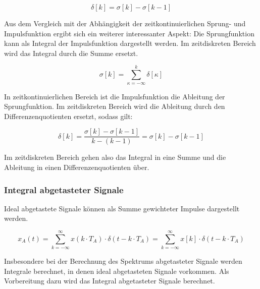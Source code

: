 \begin{equation}\label{eq:threetwentyfour}
\delta \left[k\right]=\sigma \left[k\right]-\sigma \left[k-1\right]
\end{equation}

\noindent Aus dem Vergleich mit der Abh\"{a}ngigkeit der zeitkontinuierlichen Sprung- und Impulsfunktion ergibt sich ein weiterer interessanter Aspekt: Die Sprungfunktion kann als Integral der Impulsfunktion dargestellt werden. Im zeitdiskreten Bereich wird das Integral durch die Summe ersetzt.

\begin{equation}\label{eq:threetwentyfive}
\sigma \left[k\right]=\sum _{\kappa =-\infty }^{k}\delta \left[\kappa \right]
\end{equation}

\noindent In zeitkontinuierlichen Bereich ist die Impulsfunktion die Ableitung der Sprungfunktion. Im zeitdiskreten Bereich wird die Ableitung durch den Differenzenquotienten ersetzt, sodass gilt:

\begin{equation}\label{eq:threetwentysix}
\delta \left[k\right]=\frac{\sigma \left[k\right]-\sigma \left[k-1\right]}{k-(k-1)} =\sigma \left[k\right]-\sigma \left[k-1\right]
\end{equation}

\noindent Im zeitdiskreten Bereich gehen also das Integral in eine Summe und die Ableitung in einen Differenzenquotienten \"{u}ber.

\clearpage

\subsubsection{Integral abgetasteter Signale}

\noindent Ideal abgetastete Signale können als Summe gewichteter Impulse dargestellt werden. 

\begin{equation}\label{eq:threetwentyseven}
x_{A} \left(t\right)=\sum _{k=-\infty }^{\infty }x\left(k\cdot T_{A} \right)\cdot \delta \left(t-k\cdot T_{A} \right) =\sum _{k=-\infty }^{\infty }x\left[k\right]\cdot \delta \left(t-k\cdot T_{A} \right) 
\end{equation}

\noindent Insbesondere bei der Berechnung des Spektrums abgetasteter Signale werden Integrale berechnet, in denen ideal abgetasteten Signale vorkommen. Als Vorbereitung dazu wird das Integral abgetasteter Signale berechnet. 

